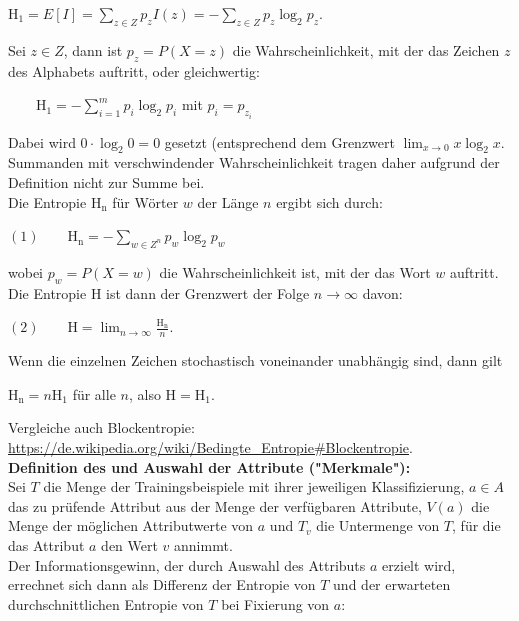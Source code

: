 \documentclass[12pt]{article}
\begin{document}
\begin{center}
$ \mathrm{H_1} = E[I]= \sum_{z\in Z} p_z I(z) = - \sum_{z\in Z} p_z \log_2 p_z $.\\
\end{center}
Sei $ z \in Z $, dann ist $ p_z = P(X=z) $ die Wahrscheinlichkeit, mit der das Zeichen $ z $ des Alphabets auftritt, oder gleichwertig:\\ 
\begin{center}
$ \qquad \mathrm{H_1} = - \sum_{i=1}^{m} p_i \log_2 p_i $ mit $ p_i = p_{z_i} $ 
\end{center}
Dabei wird $ 0\cdot\log_2 0=0 $ gesetzt (entsprechend dem Grenzwert $  \lim_{x \rightarrow 0} x \log_2 x $. Summanden mit verschwindender Wahrscheinlichkeit tragen daher aufgrund der Definition nicht zur Summe bei.\\[0.2cm]
Die Entropie $ \mathrm{H_n} $ für Wörter $ w $ der Länge $ n $ ergibt sich durch:
\begin{center}
$ (1) \qquad \mathrm{H_n} = -\sum_{w \in Z^n} p_w \log_2 p_w $
\end{center}
wobei $ p_w  = P(X=w)$ die Wahrscheinlichkeit ist, mit der das Wort $  w $ auftritt. \\[0.2cm]
Die Entropie $ \mathrm{H} $ ist dann der Grenzwert der Folge $ n\to \infty $ davon:
\begin{center}
$ (2)\qquad \mathrm{H} = \lim_{n\to \infty} \frac {\mathrm{H_n}}{n} $.
\end{center}
Wenn die einzelnen Zeichen stochastisch voneinander unabhängig sind, dann gilt
\begin{center}
 $ \mathrm{H_n} = n \mathrm{H_1} $ für alle $ n $, also $ \mathrm{H} = \mathrm{H_1} $. 
\end{center} 
%
Vergleiche auch Blockentropie: \url{https://de.wikipedia.org/wiki/Bedingte_Entropie#Blockentropie}.\\[0.4cm]
% 
\textbf{Definition des {\color{blue}{ID3-Verfahrens}}  und Auswahl der Attribute ("Merkmale"):}\\[0.3cm]
Sei $ T $ die Menge der Trainingsbeispiele mit ihrer jeweiligen Klassifizierung, $ a \in A $ das zu prüfende Attribut aus der Menge der verfügbaren Attribute, $ V(a) $ die Menge der möglichen Attributwerte von $ a $ und $ T_ v$ die Untermenge von $ T $, für die das Attribut $ a $ den Wert $ v $ annimmt. \\
Der Informationsgewinn, der durch Auswahl des Attributs $ a $ erzielt wird, errechnet sich dann als Differenz der Entropie von $ T $ und der erwarteten durchschnittlichen Entropie von $ T $ bei Fixierung von $ a $:\\
\end{document}

